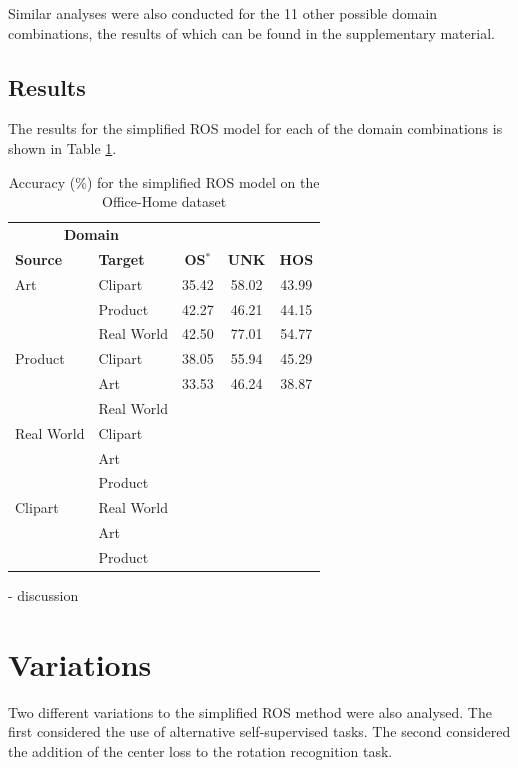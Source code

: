 \documentclass[10pt,twocolumn,letterpaper]{article}
\begin{document}
Similar analyses were also conducted for the 11 other possible domain combinations, the results of which can be found in the supplementary material.


\subsection{Results}

The results for the simplified ROS model for each of the domain combinations is shown in Table \ref{tab:results}.

\begin{table}[!htb]
  \centering
  \begin{tabular}{@{}|ll|ccc|@{}}
    \hline
\multicolumn{2}{|c}{\textbf{Domain}} & & & \\
\textbf{Source} & \textbf{Target} & \textbf{OS$^*$} & \textbf{UNK} & \textbf{HOS} \\ \hline
Art & Clipart & 35.42 & 58.02 & 43.99 \\
& Product & 42.27 & 46.21 & 44.15 \\
 & Real World & 42.50 & 77.01 & 54.77 \\ \hline
Product & Clipart & 38.05 & 55.94 & 45.29 \\
& Art & 33.53 & 46.24 & 38.87 \\
& Real World & & & \\ \hline
Real World & Clipart & & & \\
 & Art & & & \\
 & Product & & & \\ \hline
Clipart & Real World & & & \\
 & Art & & & \\
& Product & & & \\
    \hline
  \end{tabular}
  \caption{Accuracy (\%) for the simplified ROS model on the Office-Home dataset}
  \label{tab:results}
\end{table}

- discussion


\section{Variations}
\label{sec:variations}

Two different variations to the simplified ROS method were also analysed. The first considered the use of alternative self-supervised tasks. The second considered the addition of the center loss to the rotation recognition task.
\end{document}
